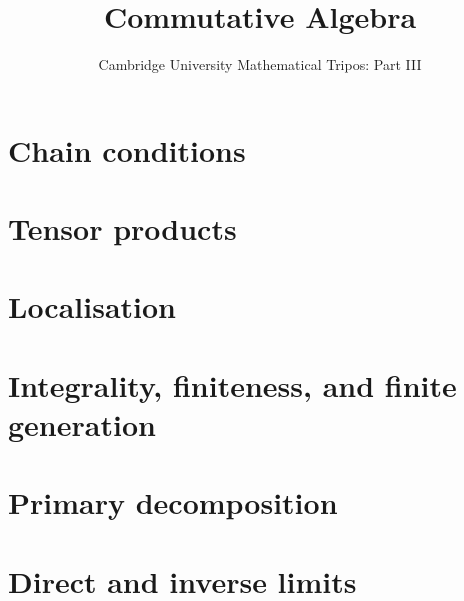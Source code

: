 \documentclass{article}
\title{Commutative Algebra}
\author{Cambridge University Mathematical Tripos: Part III}
\begin{document}
\maketitle

\tableofcontentsnewpage{}

\section{Chain conditions}

\section{Tensor products}

\section{Localisation}

\section{Integrality, finiteness, and finite generation}

\section{Primary decomposition}

\section{Direct and inverse limits}

\end{document}
